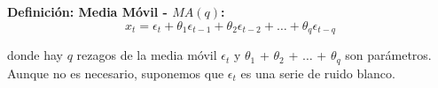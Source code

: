 %
%		
%		
%		

\begin{mdframed}[style=MyFrame]
	\begin{definition}\label{def5}
		\textbf{Definici\'on:  Media M\'ovil - $MA (q)$:}
		\begin{equation}
				x_t = \epsilon_t + \theta_1 \epsilon_{t-1} +  \theta_2 \epsilon_{t-2} + \dots{} +  \theta_q \epsilon_{t-q} 
				\end{equation}
				
				donde hay $q$ rezagos de la media m\'ovil $\epsilon_t$ y $\theta_1$  + $ \theta_2$ + $\dots{}$ + $ \theta_q$ son par\'ametros. \\
				\vspace{4mm}	
				Aunque no es necesario, suponemos que $\epsilon_t$ es una serie de ruido blanco.
	\end{definition}
\end{mdframed}



